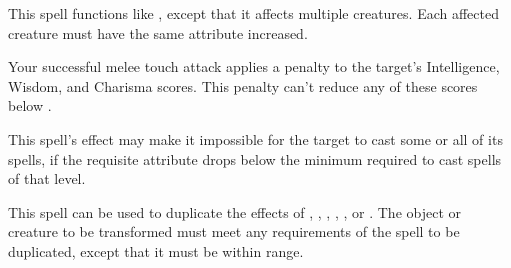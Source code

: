 \spellrng{\rngmed}
\begin{spelleffect}
  This spell functions like , except that it affects multiple creatures. Each affected creature must have the same attribute increased. 
\end{spelleffect}

\spelldur{\durshort}
\begin{spelleffect}
   Your successful melee touch attack applies a  penalty to the target's Intelligence, Wisdom, and Charisma scores. This penalty can't reduce any of these scores below .
\end{spelleffect}
\begin{spellnotes}
  This spell's effect may make it impossible for the target to cast some or all of its spells, if the requisite attribute drops below the minimum required to cast spells of that level.
\end{spellnotes}

\spellrng{\rngmed}
\begin{spelleffect}
  This spell can be used to duplicate the effects of , , , , , or . The object or creature to be transformed must meet any requirements of the spell to be duplicated, except that it must be within \rngmed range.
\end{spelleffect}

